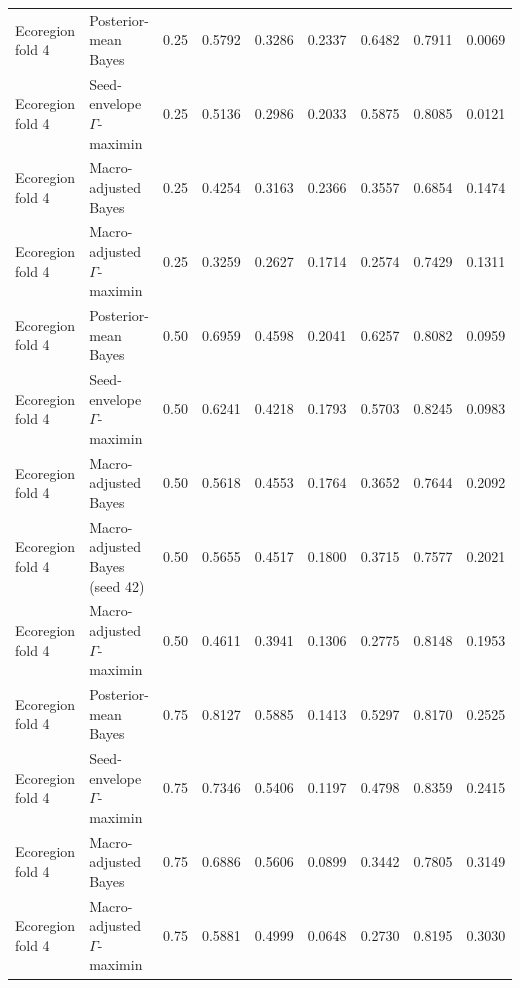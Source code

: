 \begin{table}[htbp]
\begin{tabular}{llrrrrrrr}
\midrule
Ecoregion fold 4 & Posterior-mean Bayes & 0.25 & 0.5792 & 0.3286 & 0.2337 & 0.6482 & 0.7911 & 0.0069 \\
Ecoregion fold 4 & Seed-envelope $\Gamma$-maximin & 0.25 & 0.5136 & 0.2986 & 0.2033 & 0.5875 & 0.8085 & 0.0121 \\
Ecoregion fold 4 & Macro-adjusted Bayes & 0.25 & 0.4254 & 0.3163 & 0.2366 & 0.3557 & 0.6854 & 0.1474 \\
Ecoregion fold 4 & Macro-adjusted $\Gamma$-maximin & 0.25 & 0.3259 & 0.2627 & 0.1714 & 0.2574 & 0.7429 & 0.1311 \\
Ecoregion fold 4 & Posterior-mean Bayes & 0.50 & 0.6959 & 0.4598 & 0.2041 & 0.6257 & 0.8082 & 0.0959 \\
Ecoregion fold 4 & Seed-envelope $\Gamma$-maximin & 0.50 & 0.6241 & 0.4218 & 0.1793 & 0.5703 & 0.8245 & 0.0983 \\
Ecoregion fold 4 & Macro-adjusted Bayes & 0.50 & 0.5618 & 0.4553 & 0.1764 & 0.3652 & 0.7644 & 0.2092 \\
Ecoregion fold 4 & Macro-adjusted Bayes (seed 42) & 0.50 & 0.5655 & 0.4517 & 0.1800 & 0.3715 & 0.7577 & 0.2021 \\
Ecoregion fold 4 & Macro-adjusted $\Gamma$-maximin & 0.50 & 0.4611 & 0.3941 & 0.1306 & 0.2775 & 0.8148 & 0.1953 \\
Ecoregion fold 4 & Posterior-mean Bayes & 0.75 & 0.8127 & 0.5885 & 0.1413 & 0.5297 & 0.8170 & 0.2525 \\
Ecoregion fold 4 & Seed-envelope $\Gamma$-maximin & 0.75 & 0.7346 & 0.5406 & 0.1197 & 0.4798 & 0.8359 & 0.2415 \\
Ecoregion fold 4 & Macro-adjusted Bayes & 0.75 & 0.6886 & 0.5606 & 0.0899 & 0.3442 & 0.7805 & 0.3149 \\
Ecoregion fold 4 & Macro-adjusted $\Gamma$-maximin & 0.75 & 0.5881 & 0.4999 & 0.0648 & 0.2730 & 0.8195 & 0.3030 \\
\bottomrule
\end{tabular}
\end{table}
